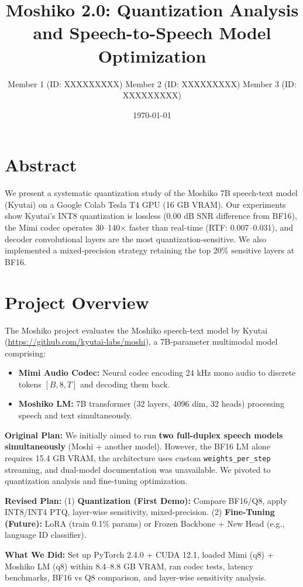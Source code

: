 \documentclass[11pt]{article}
\title{\Large\textbf{Moshiko 2.0: Quantization Analysis and Speech-to-Speech Model Optimization}}
\author{\small
    Member 1 (ID: XXXXXXXXX) \quad
    Member 2 (ID: XXXXXXXXX) \quad
    Member 3 (ID: XXXXXXXXX)
}
\date{\small\today}
\begin{document}
\maketitle
\vspace{-0.3in}

\section*{Abstract}
We present a systematic quantization study of the Moshiko 7B speech-text model (Kyutai) on a Google Colab Tesla T4 GPU (16 GB VRAM). Our experiments show Kyutai's INT8 quantization is lossless (0.00 dB SNR difference from BF16), the Mimi codec operates 30--140$\times$ faster than real-time (RTF: 0.007--0.031), and decoder convolutional layers are the most quantization-sensitive. We also implemented a mixed-precision strategy retaining the top 20\% sensitive layers at BF16.

\section{Project Overview}
The Moshiko project evaluates the Moshiko speech-text model by Kyutai (\url{https://github.com/kyutai-labs/moshi}), a 7B-parameter multimodal model comprising:

\begin{itemize}[noitemsep,topsep=2pt]
    \item \textbf{Mimi Audio Codec:} Neural codec encoding 24 kHz mono audio to discrete tokens $[B, 8, T]$ and decoding them back.
    \item \textbf{Moshiko LM:} 7B transformer (32 layers, 4096 dim, 32 heads) processing speech and text simultaneously.
\end{itemize}

\textbf{Original Plan:} We initially aimed to run \textbf{two full-duplex speech models simultaneously} (Moshi + another model). However, the BF16 LM alone requires 15.4 GB VRAM, the architecture uses custom \texttt{weights\_per\_step} streaming, and dual-model documentation was unavailable. We pivoted to quantization analysis and fine-tuning optimization.

\textbf{Revised Plan:} (1) \textbf{Quantization (First Demo):} Compare BF16/Q8, apply INT8/INT4 PTQ, layer-wise sensitivity, mixed-precision. (2) \textbf{Fine-Tuning (Future):} LoRA (train 0.1\% params) or Frozen Backbone + New Head (e.g., language ID classifier).

\textbf{What We Did:} Set up PyTorch 2.4.0 + CUDA 12.1, loaded Mimi (q8) + Moshiko LM (q8) within 8.4--8.8 GB VRAM, ran codec tests, latency benchmarks, BF16 vs Q8 comparison, and layer-wise sensitivity analysis.
\end{document}
